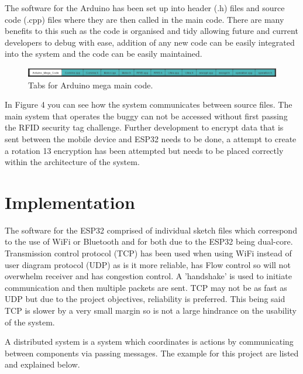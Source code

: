 \documentclass[8pt, a4paper]{article}
\begin{document}
The software for the Arduino has been set up into header (.h) files and source code (.cpp) files where they are then called in the main code. There are many benefits to this such as the code is organised and tidy allowing future and current developers to debug with ease, addition of any new code can be easily integrated into the system and the code can be easily maintained. 

\begin{figure}[H]
	\includegraphics[width=17cm]{tabs}
	\caption{Tabs for Arduino mega main code.}
\end{figure}

In Figure 4 you can see how the system communicates between source files. The main system that operates the buggy can not be accessed without first passing the RFID security tag challenge. Further development to encrypt data that is sent between the mobile device and ESP32 needs to be done, a attempt to create a rotation 13 encryption has been attempted but needs to be placed correctly within the architecture of the system. 



\section{Implementation}

The software for the ESP32 comprised of individual sketch files which correspond to the use of WiFi or Bluetooth and for both due to the ESP32 being dual-core. Transmission control protocol (TCP) has been used when using WiFi instead of user diagram protocol (UDP) as is it more reliable, has Flow control so will not overwhelm receiver and has congestion control. A 'handshake' is used to initiate communication and then multiple packets are sent. TCP may not be as fast as UDP but due to the project objectives, reliability is preferred. This being said TCP is slower by a very small margin so is not a large hindrance on the usability of the system. 


A distributed system is a system which coordinates is actions by communicating between components via passing messages. The example for this project are listed and explained below.
\end{document}
